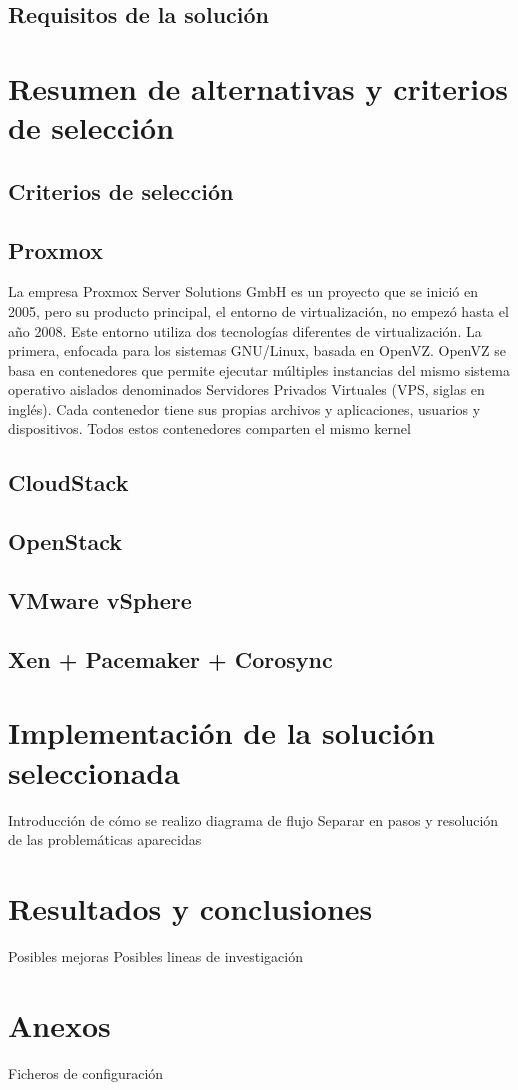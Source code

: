 \documentclass[12pt,a4paper,titlepage,twoside]{report}
\begin{document}
\section{Requisitos de la solución}

\chapter{Resumen de alternativas y criterios de selección}
\section{Criterios de selección}
\section{Proxmox}
La empresa Proxmox Server Solutions GmbH es un proyecto que se inició en 2005, pero su producto principal, el entorno de virtualización, no empezó hasta el año 2008. Este entorno utiliza dos tecnologías diferentes de virtualización. La primera, enfocada para los sistemas GNU/Linux, basada en OpenVZ. OpenVZ se basa en contenedores que permite ejecutar múltiples instancias del mismo sistema operativo aislados denominados Servidores Privados Virtuales (VPS, siglas en inglés). Cada contenedor tiene sus propias archivos y aplicaciones, usuarios y dispositivos. Todos estos contenedores comparten el mismo kernel
\section{CloudStack}
\section{OpenStack}
\section{VMware vSphere}
\section{Xen + Pacemaker + Corosync}

\chapter{Implementación de la solución seleccionada}
Introducción de cómo se realizo
diagrama de flujo
Separar en pasos y resolución de las problemáticas aparecidas
\chapter{Resultados y conclusiones}
Posibles mejoras
Posibles lineas de investigación
\chapter{Anexos}
Ficheros de configuración

\nocite{*}
\printbibliography
\end{document}
